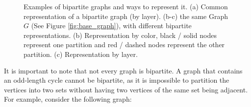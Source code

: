 \begin{figure}[!ht]
\begin{subfigure}{0.3\textwidth}
                \caption{}
                \label{fig:bipartition_by_color}
            \end{subfigure}
            \hfill
            \begin{subfigure}{0.3\textwidth}
                \centering
                \caption{}
                \label{fig:G_bipartite_by_layer}
            \end{subfigure}
            \caption[Examples of bipartite graphs and ways to represent it.]{Examples of bipartite graphs and ways to represent it. (a) Common representation of a bipartite graph (by layer). (b-c) the same Graph $G$ (See Figure \ref{fig:base_graph}), with different bipartite representations. (b) Representation by color, black / solid nodes represent one partition and red / dashed nodes represent the other partition. (c) Representation by layer.}
        \end{figure}

        It is important to note that not every graph is bipartite. A graph that contains an odd-length cycle cannot be bipartite, as it is impossible to partition the vertices into two sets without having two vertices of the same set being adjacent. For example, consider the following graph:
        
